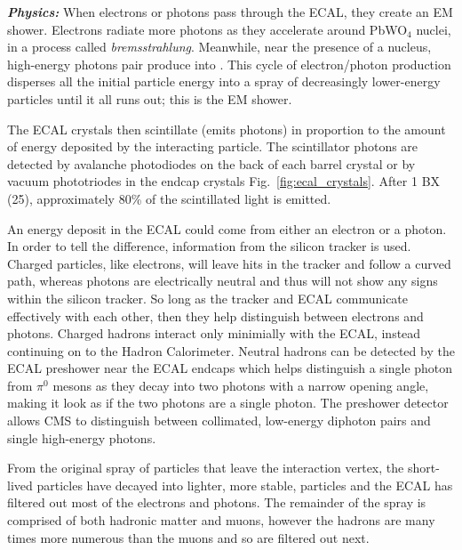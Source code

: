 \textit{\textbf{Physics:}}
When electrons or photons pass through the ECAL, they create an EM shower.
Electrons radiate more photons as they accelerate around PbWO$_4$ nuclei, in a process called \emph{bremsstrahlung}.
Meanwhile, near the presence of a nucleus, high-energy photons pair produce into \eepm.
This cycle of electron/photon production disperses all the initial particle energy into a spray of decreasingly lower-energy particles until it all runs out; this is the EM shower.

The ECAL crystals then scintillate (emits photons) in proportion to the amount of energy deposited by the interacting particle. 
The scintillator photons are detected by avalanche photodiodes on the back of each barrel crystal or by vacuum phototriodes in the endcap crystals Fig.~\ref{fig:ecal_crystals}.
After 1 BX (25\ns), approximately 80\% of the scintillated light is emitted.

An energy deposit in the ECAL could come from either an electron or a photon.
In order to tell the difference, information from the silicon tracker is used.
Charged particles, like electrons, will leave hits in the tracker and follow a curved path, whereas photons are electrically neutral and thus will not show any signs within the silicon tracker.
So long as the tracker and ECAL communicate effectively with each other, then they help distinguish between electrons and photons.
Charged hadrons interact only minimially with the ECAL, instead continuing on to the Hadron Calorimeter.
Neutral hadrons can be detected by the ECAL preshower near the ECAL endcaps which helps distinguish a single photon from $\pi^{0}$ mesons as they decay into two photons with a narrow opening angle, making it look as if the two photons are a single photon.
The preshower detector allows CMS to distinguish between collimated, low-energy diphoton pairs and single high-energy photons.

From the original spray of particles that leave the interaction vertex, the short-lived particles have decayed into lighter, more stable, particles and the ECAL has filtered out most of the electrons and photons.
The remainder of the spray is comprised of both hadronic matter and muons, however the hadrons are many times more numerous than the muons and so are filtered out next.


